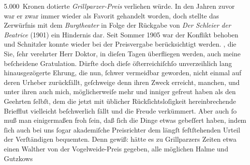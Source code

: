 \begin{ledgroupsized}[t]{13cm}
{{{                  5.000 Kronen dotierte \emph{Grillparzer-Preis}
                  verliehen würde. In den Jahren zuvor war er zwar immer wieder als Favorit
                  gehandelt worden, doch stellte das Zerwürfnis mit dem \emph{Burgtheater} in Folge der Rückgabe von \emph{Der Schleier der Beatrice} (1901) ein
                  Hindernis dar. Seit Sommer 1905 war der Konflikt behoben und Schnitzler konnte wieder bei der Preisvergabe berücksichtigt
                  werden. }}}\label{K_L01751-1h}, die Sie, ſehr verehrter Herr Doktor, in dieſen Tagen überfliegen
               werden, auch meine beſcheidene Gratulation.\pend
           \pstart
           Dürfte doch dieſe öſterreichiſchſo unverzeihlich lang hinausgezögerte Ehrung, die
               nun, ſchwer vermeidbar geworden, nicht einmal auf deren Urheber zurückfällt,
               geſchweige denn ihren Zweck erreicht, manchen, und unter ihren auch mich,
               möglicherweiſe mehr und inniger gefreut haben als den Geehrten ſelbſt, dem die jetzt
               mit üblicher Rückſichtsloſigkeit hereinbrechende Briefflut vielleicht beſchwerlich
               fällt {\pb}und die Freude verkümmert. Aber
               auch ſo muß man einigermaßen froh ſein, daß ſich die Dinge etwas gebeſſert haben,
               indem ſich auch bei uns ſogar akademiſche Preisrichter dem längſt feſtſtehenden
               Urteil der Verſtändigen bequemten. Denn gewiß: hätte es zu Grillparzers Zeiten etwa einen Walther von der Vogelweide-Preis gegeben, alle möglichen Halme und Gutzkows

\end{ledgroupsized}
